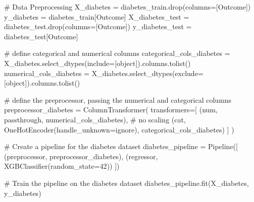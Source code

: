 \documentclass[
  letterpaper,
  DIV=11,
  numbers=noendperiod]{scrreprt}
\newenvironment{Shaded}{\begin{snugshade}}{\end{snugshade}}
\newcommand{\CommentTok}[1]{\textcolor[rgb]{0.37,0.37,0.37}{#1}}
\newcommand{\DecValTok}[1]{\textcolor[rgb]{0.68,0.00,0.00}{#1}}
\newcommand{\NormalTok}[1]{\textcolor[rgb]{0.00,0.23,0.31}{#1}}
\newcommand{\OperatorTok}[1]{\textcolor[rgb]{0.37,0.37,0.37}{#1}}
\newcommand{\StringTok}[1]{\textcolor[rgb]{0.13,0.47,0.30}{#1}}
\begin{document}
\begin{Shaded}
\begin{Highlighting}[]
\CommentTok{\# Data Preprocessing}
\NormalTok{X\_diabetes }\OperatorTok{=}\NormalTok{ diabetes\_train.drop(columns}\OperatorTok{=}\NormalTok{[}\StringTok{\textquotesingle{}Outcome\textquotesingle{}}\NormalTok{])}
\NormalTok{y\_diabetes }\OperatorTok{=}\NormalTok{ diabetes\_train[}\StringTok{\textquotesingle{}Outcome\textquotesingle{}}\NormalTok{]}
\NormalTok{X\_diabetes\_test }\OperatorTok{=}\NormalTok{ diabetes\_test.drop(columns}\OperatorTok{=}\NormalTok{[}\StringTok{\textquotesingle{}Outcome\textquotesingle{}}\NormalTok{])}
\NormalTok{y\_diabetes\_test }\OperatorTok{=}\NormalTok{ diabetes\_test[}\StringTok{\textquotesingle{}Outcome\textquotesingle{}}\NormalTok{]}

\CommentTok{\# define categorical and numerical columns}
\NormalTok{categorical\_cols\_diabetes }\OperatorTok{=}\NormalTok{ X\_diabetes.select\_dtypes(include}\OperatorTok{=}\NormalTok{[}\StringTok{\textquotesingle{}object\textquotesingle{}}\NormalTok{]).columns.tolist()}
\NormalTok{numerical\_cols\_diabetes }\OperatorTok{=}\NormalTok{ X\_diabetes.select\_dtypes(exclude}\OperatorTok{=}\NormalTok{[}\StringTok{\textquotesingle{}object\textquotesingle{}}\NormalTok{]).columns.tolist()}

\CommentTok{\# define the preprocessor, passing the numerical and categorical columns}
\NormalTok{preprocessor\_diabetes }\OperatorTok{=}\NormalTok{ ColumnTransformer(}
\NormalTok{    transformers}\OperatorTok{=}\NormalTok{[}
\NormalTok{        (}\StringTok{\textquotesingle{}num\textquotesingle{}}\NormalTok{, }\StringTok{\textquotesingle{}passthrough\textquotesingle{}}\NormalTok{, numerical\_cols\_diabetes),  }\CommentTok{\# no scaling}
\NormalTok{        (}\StringTok{\textquotesingle{}cat\textquotesingle{}}\NormalTok{, OneHotEncoder(handle\_unknown}\OperatorTok{=}\StringTok{\textquotesingle{}ignore\textquotesingle{}}\NormalTok{), categorical\_cols\_diabetes)}
\NormalTok{    ]}
\NormalTok{)}

\CommentTok{\# Create a pipeline for the diabetes dataset}
\NormalTok{diabetes\_pipeline }\OperatorTok{=}\NormalTok{ Pipeline([}
\NormalTok{    (}\StringTok{\textquotesingle{}preprocessor\textquotesingle{}}\NormalTok{, preprocessor\_diabetes),}
\NormalTok{    (}\StringTok{\textquotesingle{}regressor\textquotesingle{}}\NormalTok{, XGBClassifier(random\_state}\OperatorTok{=}\DecValTok{42}\NormalTok{))}
\NormalTok{])}

\CommentTok{\# Train the pipeline on the diabetes dataset}
\NormalTok{diabetes\_pipeline.fit(X\_diabetes, y\_diabetes)}
\end{Highlighting}
\end{Shaded}
\end{document}
